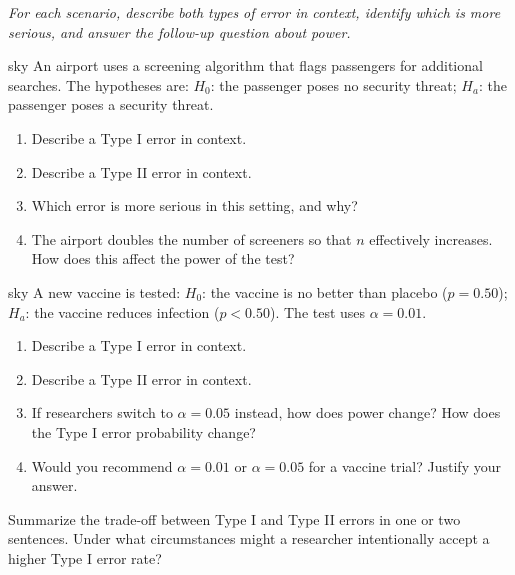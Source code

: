 \documentclass[10pt]{article}
\begin{document}
\namepartnerperiod

\vspace{0.15in}

\textit{For each scenario, describe both types of error in context, identify which is more
serious, and answer the follow-up question about power.}

\begin{scenariobox}{sky}
An airport uses a screening algorithm that flags passengers for additional searches. The
hypotheses are: $H_0$: the passenger poses no security threat; $H_a$: the passenger poses a
security threat.

\begin{enumerate}[label=\alph*.]
  \item Describe a Type I error in context. 
  \item Describe a Type II error in context. 
  \item Which error is more serious in this setting, and why? 
  \item The airport doubles the number of screeners so that $n$ effectively increases. How
        does this affect the power of the test? 
\end{enumerate}
\end{scenariobox}

\begin{scenariobox}{sky}
A new vaccine is tested: $H_0$: the vaccine is no better than placebo ($p = 0.50$);
$H_a$: the vaccine reduces infection ($p < 0.50$). The test uses $\alpha = 0.01$.

\begin{enumerate}[label=\alph*.]
  \item Describe a Type I error in context. 
  \item Describe a Type II error in context. 
  \item If researchers switch to $\alpha = 0.05$ instead, how does power change?
        How does the Type I error probability change? 
  \item Would you recommend $\alpha = 0.01$ or $\alpha = 0.05$ for a vaccine trial?
        Justify your answer. 
\end{enumerate}
\end{scenariobox}

\begin{reflectionbox}
Summarize the trade-off between Type I and Type II errors in one or two sentences.
Under what circumstances might a researcher intentionally accept a higher Type I error rate?
\end{reflectionbox}
\end{document}
